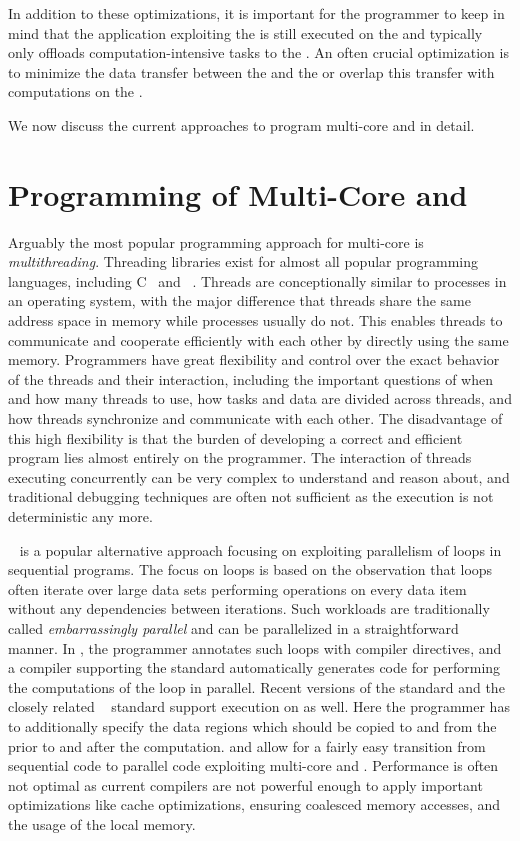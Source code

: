 \noindent
In addition to these optimizations, it is important for the programmer to keep in mind that the application exploiting the \GPU is still executed on the \CPU and typically only offloads computation-intensive tasks to the \GPU.
An often crucial optimization is to minimize the data transfer between the \CPU and the \GPU or overlap this transfer with computations on the \GPU.

\bigskip

\noindent
We now discuss the current approaches to program multi-core \CPUs and \GPUs in detail.



\section{Programming of Multi-Core \CPUs and \GPUs}
Arguably the most popular programming approach for multi-core \CPUs is \emph{multithreading}.
Threading libraries exist for almost all popular programming languages, including C~\cite{Cstandard,Pthreads} and \Cpp~\cite{Cppstandard}.
Threads are conceptionally similar to processes in an operating system, with the major difference that threads share the same address space in memory while processes usually do not.
This enables threads to communicate and cooperate efficiently with each other by directly using the same memory.
Programmers have great flexibility and control over the exact behavior of the threads and their interaction, including the important questions of when and how many threads to use, how tasks and data are divided across threads, and how threads synchronize and communicate with each other.
The disadvantage of this high flexibility is that the burden of developing a correct and efficient program lies almost entirely on the programmer.
The interaction of threads executing concurrently can be very complex to understand and reason about, and traditional debugging techniques are often not sufficient as the execution is not deterministic any more.

\OpenMP~\cite{OpenMP} is a popular alternative approach focusing on exploiting parallelism of loops in sequential programs.
The focus on loops is based on the observation that loops often iterate over large data sets performing operations on every data item without any dependencies between iterations.
Such workloads are traditionally called \emph{embarrassingly parallel} and can be parallelized in a straightforward manner.
In \OpenMP, the programmer annotates such loops with compiler directives, and a compiler supporting the \OpenMP standard automatically generates code for performing the computations of the loop in parallel.
Recent versions of the \OpenMP standard and the closely related \OpenACC~\cite{OpenACC} standard support execution on \GPUs as well.
Here the programmer has to additionally specify the data regions which should be copied to and from the \GPU prior to and after the computation.
\OpenMP and \OpenACC allow for a fairly easy transition from sequential code to parallel code exploiting multi-core \CPUs and \GPUs.
Performance is often not optimal as current compilers are not powerful enough to apply important optimizations like cache optimizations, ensuring coalesced memory accesses, and the usage of the local memory.

